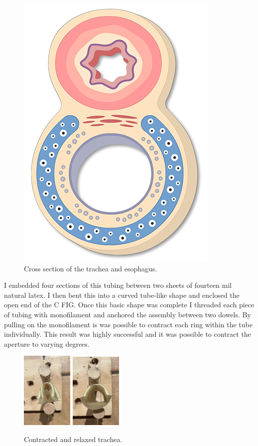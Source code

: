 \documentclass[letterpaper]{article}
\begin{document}
\begin{figure}[h]
\centering
\includegraphics[scale=0.3]{images/trachea.png}
\caption{Cross section of the trachea and esophagus.}
\end{figure}

I embedded four sections of this tubing between two sheets of fourteen mil natural latex. I then bent this into a curved tube-like shape and enclosed the open end of the C FIG. Once this basic shape was complete I threaded each piece of tubing with monofilament and anchored the assembly between two dowels. By pulling on the monofilament is was possible to contract each ring within the tube individually. This result was highly successful and it was possible to contract the aperture to varying degrees.

\begin{figure}[h]
\centering
\includegraphics[width=0.22\textwidth]{images/46.JPG}
\includegraphics[width=0.22\textwidth]{images/52.JPG}
\caption{Contracted and relaxed trachea.}
\end{figure}
\end{document}
